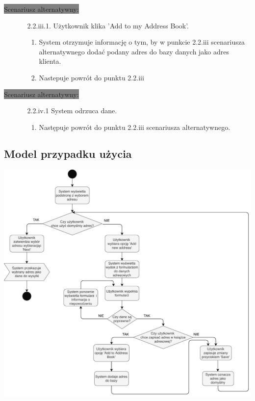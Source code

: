 \documentclass[12pt]{report}
\begin{document}
	\colorbox{grey}{Scenariusz alternatywny:}
	\begin{enumerate}\addtocounter{enumi}{2}
		\item[]
		\begin{enumerate}
			\item[2.2.iii.1.] Użytkownik klika 'Add to my Address Book'.
			\begin{enumerate}
				\item System otrzymuje informację o tym, by w punkcie 2.2.iii scenariusza alternatywnego dodać podany adres do bazy danych jako adres klienta.
				\item Nastepuje powrót do punktu 2.2.iii
			\end{enumerate}
		\end{enumerate}
	\end{enumerate}
	
	\colorbox{grey}{Scenariusz alternatywny:}
	\begin{enumerate}\addtocounter{enumi}{2}
		\item[]
		\begin{enumerate}
			\item[2.2.iv.1] System odrzuca dane.
			\begin{enumerate}
				\item Następuje powrót do punktu 2.2.iii scenariusza alternatywnego.
			\end{enumerate}
		\end{enumerate}
	\end{enumerate}
	
	\newpage
	
	\subsection{Model przypadku użycia}
	\begin{center}
		\includegraphics[width=450pt]{wysylka.pdf}
	\end{center}
	\newpage
	
\end{document}
